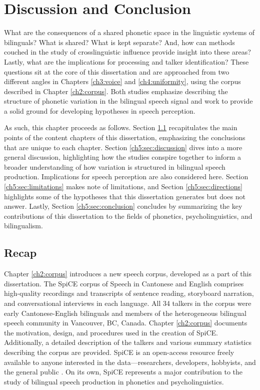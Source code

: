 
\chapter{Discussion and Conclusion}\label{ch5:discussion}

What are the consequences of a shared phonetic space in the linguistic systems of bilinguals? What is shared? What is kept separate? And, how can methods couched in the study of crosslinguistic influence provide insight into these areas? Lastly, what are the implications for processing and talker identification? These questions sit at the core of this dissertation and are approached from two different angles in Chapters \ref{ch3:voice} and \ref{ch4:uniformity}, using the corpus described in Chapter \ref{ch2:corpus}. Both studies emphasize describing the structure of phonetic variation in the bilingual speech signal and work to provide a solid ground for developing hypotheses in speech perception. 

As such, this chapter proceeds as follows. Section \ref{ch5:sec:recap} recapitulates the main points of the content chapters of this dissertation, emphasizing the conclusions that are unique to each chapter. Section \ref{ch5:sec:discussion} dives into a more general discussion, highlighting how the studies conspire together to inform a broader understanding of how variation is structured in bilingual speech production. Implications for speech perception are also considered here. Section \ref{ch5:sec:limitations} makes note of limitations, and Section \ref{ch5:sec:directions} highlights some of the hypotheses that this dissertation generates but does not answer. Lastly, Section \ref{ch5:sec:conclusion} concludes by summarizing the key contributions of this dissertation to the fields of phonetics, psycholinguistics, and bilingualism.

\section{Recap}\label{ch5:sec:recap}

Chapter \ref{ch2:corpus} introduces a new speech corpus, developed as a part of this dissertation. The SpiCE corpus of Speech in Cantonese and English comprises high-quality recordings and transcripts of sentence reading, storyboard narration, and conversational interviews in each language. All 34 talkers in the corpus were early Cantonese-English bilinguals and members of the heterogeneous bilingual speech community in Vancouver, BC, Canada. Chapter \ref{ch2:corpus} documents the motivation, design, and procedures used in the creation of SpiCE. Additionally, a detailed description of the talkers and various summary statistics describing the corpus are provided. SpiCE is an open-access resource freely available to anyone interested in the data---researchers, developers, hobbyists, and the general public \citep{johnson_2021_spice}. On its own, SpiCE represents a major contribution to the study of bilingual speech production in phonetics and psycholinguistics. 

